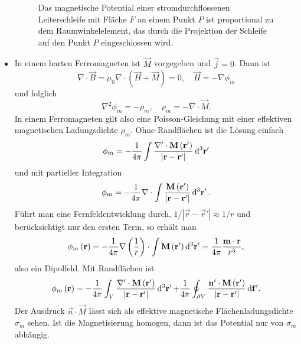 \begin{itemize}
	      \begin{figure}[htb]
		      \centering
		      \tfigConductorLoopWithRefPoint
		      \caption{Das magnetische Potential einer stromdurchflossenen Leiterschleife mit Fläche $F$ an einem Punkt $P$ ist proportional zu dem Raumwinkelelement, das durch die Projektion der Schleife auf den Punkt $P$ eingeschlossen wird. }
		      \label{fig:ConductorLoopWithRefPoint}
	      \end{figure}
	\item In einem harten Ferromagneten ist $\vec {M}$ vorgegeben und $\vec {j}=0$. Dann ist
	      \begin{equation*}
		      \nabla \cdot \vec {B}=\mu _{0}\nabla \cdot \left(\vec {H}+\vec {M}\right)=0,\quad \vec {H}=-\nabla \phi _{m}
	      \end{equation*}
	      und folglich
	      \begin{equation*}
		      \nabla ^{2}\phi _{m}=-\rho _{m},\quad \rho _{m}=-\nabla \cdot \vec {M}.
	      \end{equation*}
	      In einem Ferromagneten gilt also eine Poisson-Gleichung mit einer effektiven magnetischen Ladungsdichte $\rho _{m}$. Ohne Randflächen ist die Lösung einfach
	      \begin{equation*}
		      \phi _{m}=-\frac{1}{4\pi }\int \frac{\nabla '\cdot \vec {M}\left(\vec {r}'\right)}{\left| \vec {r}-\vec {r}'\right| }\diffa[3]{\vec{r}'}
	      \end{equation*}
	      und mit partieller Integration
	      \begin{equation*}
		      \phi _{m}=-\frac{1}{4\pi }\nabla \cdot \int \frac{\vec {M}\left(\vec {r}'\right)}{\left| \vec {r}-\vec {r}'\right| }\diffa[3]{\vec{r}'}.
	      \end{equation*}
	      Führt man eine Fernfeldentwicklung durch, $1/\left| \vec {r}-\vec {r}'\right| \approx 1/r$ und berücksichtigt nur den ersten Term, so erhält man
	      \begin{equation*}
		      \phi _{m}\left(\vec {r}\right)=-\frac{1}{4\pi }\nabla \left(\frac{1}{r}\right)\cdot \int \vec {M}\left(\vec {r}'\right)\diffa[3]{\vec{r}'}=\frac{1}{4\pi }\frac{\vec {m}\cdot \vec {r}}{r^{3}},
	      \end{equation*}
	      also ein Dipolfeld. Mit Randflächen ist
	      \begin{equation*}
		      \phi _{m}\left(\vec {r}\right)=-\frac{1}{4\pi }\int _{V}\frac{\nabla '\cdot \vec {M}\left(\vec {r}'\right)}{\left| \vec {r}-\vec {r}'\right| }\diffa[3]{\vec{r}'}+\frac{1}{4\pi }\oint _{\partial V}\frac{\vec {n}'\cdot \vec {M}\left(\vec {r}'\right)}{\left| \vec {r}-\vec {r}'\right| }\diff \vec {f}'.
	      \end{equation*}
	      Der Ausdruck $\vec {n}\cdot \vec {M}$ lässt sich als effektive magnetische Flächenladungsdichte $\sigma _{m}$ sehen. Ist die Magnetisierung homogen, dann ist das Potential nur von $\sigma _{m}$ abhängig.
\end{itemize}
